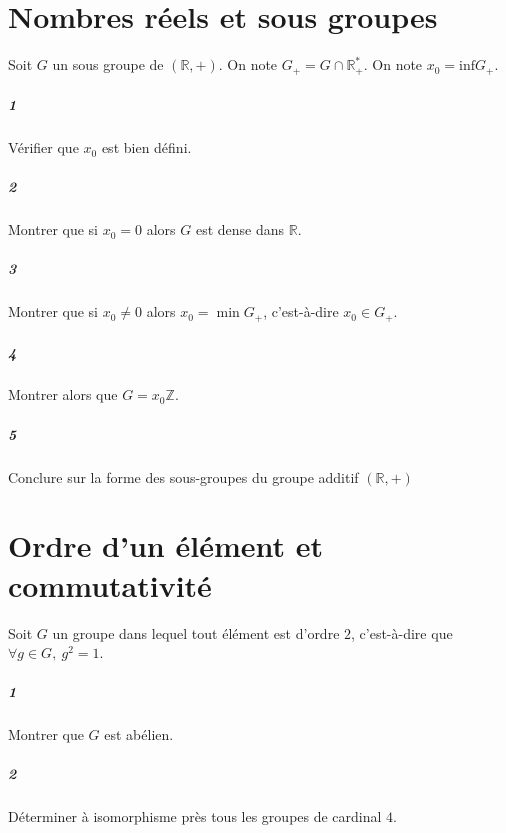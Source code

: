 \documentclass[10pt,a4paper]{article}
\begin{document}
\section{Nombres réels et sous groupes}
Soit $G$ un sous groupe de $(\mathbb{R},+)$. On note $G_+=G \cap \mathbb{R}_+^*$. On note $x_0=\text{inf}G_+$.
\subparagraph{1}Vérifier que $x_0$ est bien défini.
\subparagraph{2}Montrer que si $x_0=0$ alors $G$ est dense dans $\mathbb{R}$.
\subparagraph{3}Montrer que si $x_0 \neq 0$ alors $x_0=\min G_+$, c'est-à-dire $x_0 \in G_+$.
\subparagraph{4}Montrer alors que $G=x_0 \mathbb{Z}$.
\subparagraph{5}Conclure sur la forme des sous-groupes du groupe additif $(\mathbb{R},+)$
\section{Ordre d'un élément et commutativité}
Soit $G$ un groupe dans lequel tout élément est d'ordre $2$, c'est-à-dire que $\forall g \in G, \ g^2=1$.
\subparagraph{1}Montrer que $G$ est abélien.
\subparagraph{2}Déterminer à isomorphisme près tous les groupes de cardinal $4$. 
\end{document}
